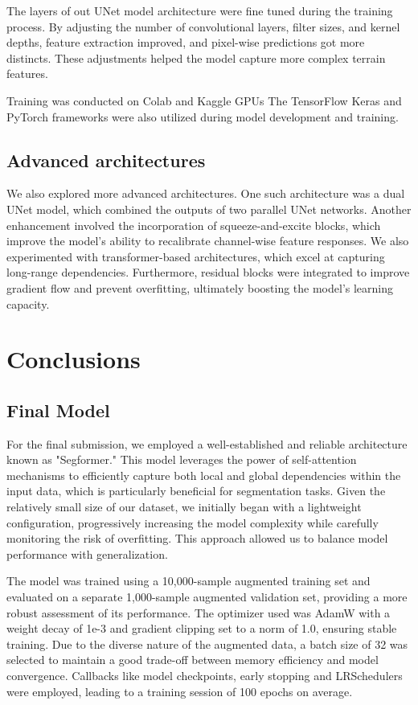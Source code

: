 \documentclass[11pt]{article}
\begin{document}
\begin{multicols}{2}
        The layers of out UNet model architecture were fine tuned during the training process.
        By adjusting the number of convolutional layers, filter sizes, and kernel depths, feature extraction improved, and pixel-wise predictions got more distincts.
        These adjustments helped the model capture more complex terrain features.

        Training was conducted on Colab\cite{colab2024} and Kaggle\cite{kaggle2024} GPUs
        The TensorFlow\cite{tensorflow2015} Keras\cite{keras2015} and PyTorch\cite{pytorch2019} frameworks were also utilized during model development and training.
        
        \subsection{Advanced architectures}
        
        We also explored more advanced architectures. One such architecture was a dual UNet model, which combined the outputs of two parallel UNet networks. Another enhancement involved the incorporation of squeeze-and-excite blocks, which improve the model's ability to recalibrate channel-wise feature responses. We also experimented with transformer-based architectures, which excel at capturing long-range dependencies. Furthermore, residual blocks were integrated to improve gradient flow and prevent overfitting, ultimately boosting the model's learning capacity.

        \section{Conclusions}
        \subsection{Final Model}
        For the final submission, we employed a well-established and reliable architecture known as "Segformer." This model leverages the power of self-attention mechanisms to efficiently capture both local and global dependencies within the input data, which is particularly beneficial for segmentation tasks. Given the relatively small size of our dataset, we initially began with a lightweight configuration, progressively increasing the model complexity while carefully monitoring the risk of overfitting. This approach allowed us to balance model performance with generalization.
        
        The model was trained using a 10,000-sample augmented training set and evaluated on a separate 1,000-sample augmented validation set, providing a more robust assessment of its performance. The optimizer used was AdamW with a weight decay of 1e-3 and gradient clipping set to a norm of 1.0, ensuring stable training. Due to the diverse nature of the augmented data, a batch size of 32 was selected to maintain a good trade-off between memory efficiency and model convergence. Callbacks like model checkpoints, early stopping and LRSchedulers were employed, leading to a training session of 100 epochs on average. 
        

\end{multicols}
\end{document}

